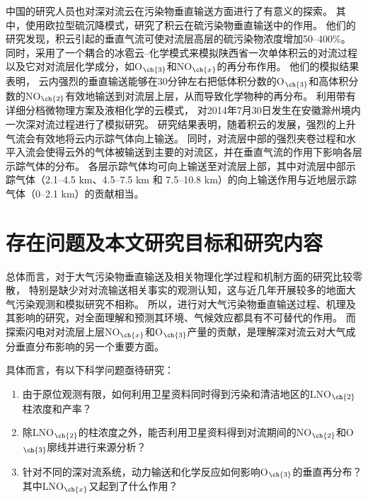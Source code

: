 中国的研究人员也对深对流云在污染物垂直输送方面进行了有意义的探索。
其中，\citet{GaoHuiWang.1998}使用欧拉型硫沉降模式，研究了积云在硫污染物垂直输送中的作用。
他们的研究发现，积云引起的垂直气流可使对流层高层的硫污染物浓度增加50--400\%。
同时，\citet{LiBing.1999,LiBing.2001}采用了一个耦合的冰雹云--化学模式来模拟陕西省一次单体积云的对流过程以及它对对流层化学成分，如O$_{\ch{3}}$和NO$_{\ch{x}}$的再分布作用。
他们的模拟结果表明，
云内强烈的垂直输送能够在30分钟左右把低体积分数的O$_{\ch{3}}$和高体积分数的NO$_{\ch{2}}$有效地输送到对流层上层，从而导致化学物种的再分布。
\citet{HuJiaYing.2019}利用带有详细分档微物理方案及液相化学的云模式，
对2014年7月30日发生在安徽滁州境内一次深对流过程进行了模拟研究。
研究结果表明，随着积云的发展，强烈的上升气流会有效地将云内示踪气体向上输送。
同时，对流层中部的强烈夹卷过程和水平入流会使得云外的气体被输送到主要的对流区，并在垂直气流的作用下影响各层示踪气体的分布。
各层示踪气体均可向上输送至对流层上部，其中对流层中部示踪气体（2.1--4.5 km、4.5--7.5 km 和 7.5--10.8 km）的向上输送作用与近地层示踪气体（0--2.1 km）的贡献相当。




\section{存在问题及本文研究目标和研究内容}

总体而言，对于大气污染物垂直输送及相关物理化学过程和机制方面的研究比较零散，
特别是缺少对对流输送相关事实的观测认知，这与近几年开展较多的地面大气污染观测和模拟研究不相称。
所以，进行对大气污染物垂直输送过程、机理及其影响的研究，对全面理解和预测其环境、气候效应都具有不可替代的作用。
而探索闪电对对流层上层NO$_{\ch{x}}$和O$_{\ch{3}}$产量的贡献，是理解深对流云对大气成分垂直分布影响的另一个重要方面。

具体而言，有以下科学问题亟待研究：

\begin{enumerate}[label=（\arabic*）, labelindent=\parindent, nosep, leftmargin=0pt, widest=0, itemindent=*, topsep=0pt, partopsep=0pt, parsep=0pt]

\item 由于原位观测有限，如何利用卫星资料同时得到污染和清洁地区的LNO$_{\ch{2}}$柱浓度和产率？

\item 除LNO$_{\ch{2}}$的柱浓度之外，能否利用卫星资料得到对流期间的NO$_{\ch{2}}$和O$_{\ch{3}}$廓线并进行来源分析？

\item 针对不同的深对流系统，动力输送和化学反应如何影响O$_{\ch{3}}$的垂直再分布？其中LNO$_{\ch{x}}$又起到了什么作用？

\end{enumerate}

